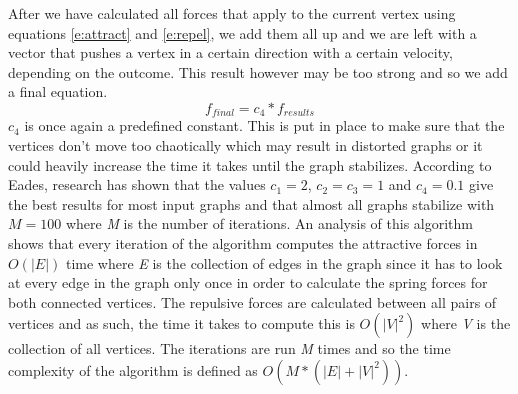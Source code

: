\documentclass[a4paper,12pt,twoside]{article}
\begin{document}
\newline
After we have calculated all forces that apply to the current vertex using equations \ref{e:attract} and \ref{e:repel}, we add them all up and we are left with a vector that pushes a vertex in a certain direction with a certain velocity, depending on the outcome. This result however may be too strong and so we add a final equation.
\begin{equation}\label{e:damper}
f_{final} = c_4 * f_{results}
\end{equation}
$c_4$ is once again a predefined constant. This is put in place to make sure that the vertices don't move too chaotically which may result in distorted graphs or it could heavily increase the time it takes until the graph stabilizes.
\newline
According to Eades, research has shown that the values $c_1=2$, $c_2=c_3=1$ and $c_4=0.1$ give the best results for most input graphs and that almost all graphs stabilize with $M=100$ where \emph{M} is the number of iterations.
\newline
An analysis of this algorithm shows that every iteration of the algorithm computes the attractive forces in $O(|E|)$ time where \emph{E} is the collection of edges in the graph since it has to look at every edge in the graph only once in order to calculate the spring forces for both connected vertices. The repulsive forces are calculated between all pairs of vertices and as such, the time it takes to compute this is $O(|V|^2)$ where \emph{V} is the collection of all vertices. The iterations are run \emph{M} times and so the time complexity of the algorithm is defined as $O(M*(|E| + |V|^2))$.
\end{document}
